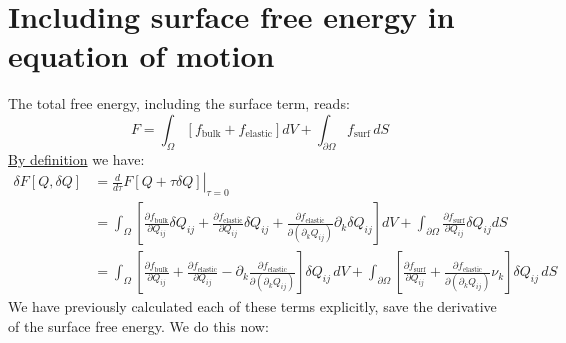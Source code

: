 \documentclass[reqno]{article}
\newcommand{\fb}{f_\text{bulk}}
\newcommand{\fe}{f_\text{elastic}}
\newcommand{\fs}{f_\text{surf}}
\begin{document}
\section{Including surface free energy in equation of motion}

The total free energy, including the surface term, reads:
\begin{equation}
    F
    =
    \int_\Omega \left[ 
        \fb
        + \fe
    \right]
    dV
    +
    \int_{\partial \Omega}
    \fs \,
    dS
\end{equation}
\href{https://www.wikiwand.com/en/Functional_derivative#Functional_differential}{By definition} we have:
\begin{equation} \label{eq:free-energy-differential}
\begin{split}
    \delta F[Q, \delta Q]
    &=
    \left. \frac{d}{d \tau} F[Q + \tau \delta Q] \right|_{\tau = 0} \\
    &=
    \int_\Omega \left[
        \frac{\partial \fb}{\partial Q_{ij}} \delta Q_{ij}
        + \frac{\partial \fe}{\partial Q_{ij}} \delta Q_{ij}
        + \frac{\partial \fe}{\partial \left(\partial_k Q_{ij}\right)} \partial_k \delta Q_{ij}
    \right] dV
    +
    \int_{\partial \Omega} \frac{\partial \fs}{\partial Q_{ij}} \delta Q_{ij} dS \\
    &=
    \int_\Omega \left[
        \frac{\partial \fb}{\partial Q_{ij}}
        + \frac{\partial \fe}{\partial Q_{ij}}
        - \partial_k \frac{\partial \fe}{\partial \left(\partial_k Q_{ij}\right)}
    \right] \delta Q_{ij} \, dV
    +
    \int_{\partial \Omega} \left[
        \frac{\partial \fs}{\partial Q_{ij}} 
        + \frac{\partial \fe}{\partial \left(\partial_k Q_{ij}\right)} \nu_k
    \right] \delta Q_{ij} \, dS
\end{split}
\end{equation}
We have previously calculated each of these terms explicitly, save the derivative of the surface free energy.
We do this now:
\end{document}
